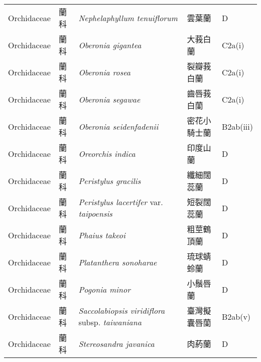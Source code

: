 {\begin{longtable}{p{2.5cm}p{2.5cm}p{4.5cm}p{2.5cm}p{3cm}}
    Orchidaceae & 蘭科 & \textit{Nephelaphyllum tenuiflorum}  & 雲葉蘭 & D \index{Nephelaphyllum@\textit{Nephelaphyllum}!tenuiflorum@\textit{tenuiflorum}}  \index{雲葉蘭} \\
    Orchidaceae & 蘭科 & \textit{Oberonia gigantea}  & 大莪白蘭 & C2a(i) \index{Oberonia@\textit{Oberonia}!gigantea@\textit{gigantea}}  \index{大莪白蘭} \\
    Orchidaceae & 蘭科 & \textit{Oberonia rosea}  & 裂瓣莪白蘭 & C2a(i) \index{Oberonia@\textit{Oberonia}!rosea@\textit{rosea}}  \index{裂瓣莪白蘭} \\
    Orchidaceae & 蘭科 & \textit{Oberonia segawae}  & 齒唇莪白蘭 & C2a(i) \index{Oberonia@\textit{Oberonia}!segawae@\textit{segawae}}  \index{齒唇莪白蘭} \\
    Orchidaceae & 蘭科 & \textit{Oberonia seidenfadenii}  & 密花小騎士蘭 & B2ab(iii) \index{Oberonia@\textit{Oberonia}!seidenfadenii@\textit{seidenfadenii}}  \index{密花小騎士蘭} \\
    Orchidaceae & 蘭科 & \textit{Oreorchis indica}  & 印度山蘭 & D \index{Oreorchis@\textit{Oreorchis}!indica@\textit{indica}}  \index{印度山蘭} \\
    Orchidaceae & 蘭科 & \textit{Peristylus gracilis}  & 纖細闊蕊蘭 & D \index{Peristylus@\textit{Peristylus}!gracilis@\textit{gracilis}}  \index{纖細闊蕊蘭} \\
    Orchidaceae & 蘭科 & \textit{Peristylus lacertifer} var. \textit{taipoensis}  & 短裂闊蕊蘭 & D \index{Peristylus@\textit{Peristylus}!lacertifer@\textit{lacertifer}!var. taipoensis@var. \textit{taipoensis}}  \index{短裂闊蕊蘭} \\
    Orchidaceae & 蘭科 & \textit{Phaius takeoi}  & 粗莖鶴頂蘭 & D \index{Phaius@\textit{Phaius}!takeoi@\textit{takeoi}}  \index{粗莖鶴頂蘭} \\
    Orchidaceae & 蘭科 & \textit{Platanthera sonoharae}  & 琉球蜻蛉蘭 & D \index{Platanthera@\textit{Platanthera}!sonoharae@\textit{sonoharae}}  \index{琉球蜻蛉蘭} \\
    Orchidaceae & 蘭科 & \textit{Pogonia minor}  & 小鬚唇蘭 & D \index{Pogonia@\textit{Pogonia}!minor@\textit{minor}}  \index{小鬚唇蘭} \\
    Orchidaceae & 蘭科 & \textit{Saccolabiopsis viridiflora} subsp. \textit{taiwaniana}  & 臺灣擬囊唇蘭 & B2ab(v) \index{Saccolabiopsis@\textit{Saccolabiopsis}!viridiflora@\textit{viridiflora}!subsp. taiwaniana@subsp. \textit{taiwaniana}}  \index{臺灣擬囊唇蘭} \\
    Orchidaceae & 蘭科 & \textit{Stereosandra javanica}  & 肉葯蘭 & D \index{Stereosandra@\textit{Stereosandra}!javanica@\textit{javanica}}  \index{肉葯蘭} \\

\end{longtable}}
